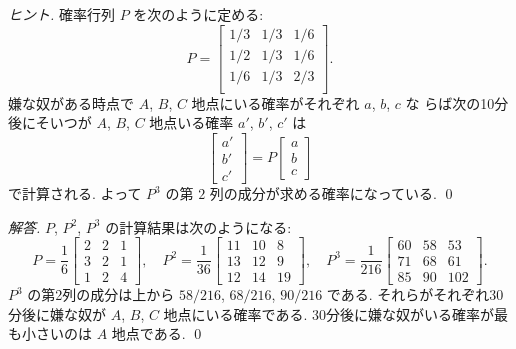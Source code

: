 \documentclass[12pt,twoside]{jarticle}
\newcommand\commentout[1]{#1}
\newcommand\commentout[1]{}
\begin{document}
\begin{proof}[ヒント]
  確率行列 $P$ を次のように定める:
  \begin{equation*}
    P =
    \begin{bmatrix}
      1/3 & 1/3 & 1/6 \\
      1/2 & 1/3 & 1/6 \\
      1/6 & 1/3 & 2/3 \\
    \end{bmatrix}.
  \end{equation*}
  嫌な奴がある時点で $A$, $B$, $C$ 地点にいる確率がそれぞれ $a$, $b$, $c$ な
  らば次の10分後にそいつが $A$, $B$, $C$ 地点いる確率 $a'$, $b'$, $c'$ は
  \begin{equation*}
    \begin{bmatrix}
      a' \\ b' \\ c'
    \end{bmatrix}
    = P
    \begin{bmatrix}
      a \\ b \\ c
    \end{bmatrix}
  \end{equation*}
  で計算される.  よって $P^3$ の第 $2$ 列の成分が求める確率になっている.
  \qed
\end{proof}

\commentout{
\begin{proof}[解答]
  $P$, $P^2$, $P^3$ の計算結果は次のようになる:
  \begin{equation*}
    P = \frac{1}{6}
    \left[
      \begin{array}{rrr}
        2 & 2 & 1 \\
        3 & 2 & 1 \\
        1 & 2 & 4
      \end{array}
    \right],
    \quad
    P^2 = \frac{1}{36}
    \left[ 
      \begin{array}{rrr}
        11 & 10 & 8 \\
        13 & 12 & 9 \\
        12 & 14 & 19
      \end{array}
    \right],
    \quad
    P^3 = \frac{1}{216}
    \left[ 
      \begin{array}{rrr}
        60 & 58 & 53 \\
        71 & 68 & 61 \\
        85 & 90 & 102
      \end{array}
    \right].
  \end{equation*}
  $P^3$ の第2列の成分は上から $58/216$, $68/216$, $90/216$ である.
  それらがそれぞれ30分後に嫌な奴が $A$, $B$, $C$ 地点にいる確率である.
  30分後に嫌な奴がいる確率が最も小さいのは $A$ 地点である.
  \qed
\end{proof}
}
\end{document}
